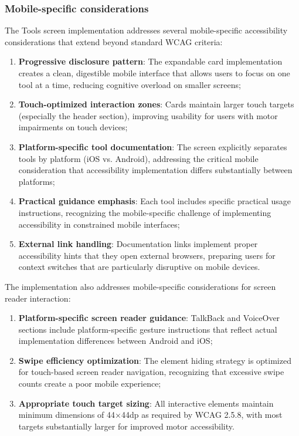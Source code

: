 \subsubsection{Mobile-specific considerations}

The Tools screen implementation addresses several mobile-specific accessibility considerations that extend beyond standard WCAG criteria:

\begin{enumerate}
    \item \textbf{Progressive disclosure pattern}: The expandable card implementation creates a clean, digestible mobile interface that allows users to focus on one tool at a time, reducing cognitive overload on smaller screens;
    
    \item \textbf{Touch-optimized interaction zones}: Cards maintain larger touch targets (especially the header section), improving usability for users with motor impairments on touch devices;
    
    \item \textbf{Platform-specific tool documentation}: The screen explicitly separates tools by platform (iOS vs. Android), addressing the critical mobile consideration that accessibility implementation differs substantially between platforms;
    
    \item \textbf{Practical guidance emphasis}: Each tool includes specific practical usage instructions, recognizing the mobile-specific challenge of implementing accessibility in constrained mobile interfaces;
    
    \item \textbf{External link handling}: Documentation links implement proper accessibility hints that they open external browsers, preparing users for context switches that are particularly disruptive on mobile devices.
\end{enumerate}

The implementation also addresses mobile-specific considerations for screen reader interaction:

\begin{enumerate}
    \item \textbf{Platform-specific screen reader guidance}: TalkBack and VoiceOver sections include platform-specific gesture instructions that reflect actual implementation differences between Android and iOS;
    
    \item \textbf{Swipe efficiency optimization}: The element hiding strategy is optimized for touch-based screen reader navigation, recognizing that excessive swipe counts create a poor mobile experience;
    
    \item \textbf{Appropriate touch target sizing}: All interactive elements maintain minimum dimensions of 44×44dp as required by WCAG 2.5.8, with most targets substantially larger for improved motor accessibility.
\end{enumerate}

